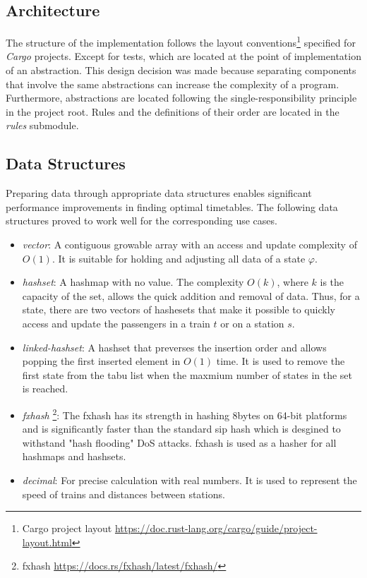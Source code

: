 \documentclass[a4paper,12pt,parskip]{article}
\begin{document}
\subsection{Architecture}

The structure of the implementation follows the layout 
conventions\footnote{Cargo project layout \url{https://doc.rust-lang.org/cargo/guide/project-layout.html}} 
specified for \emph{Cargo} projects. Except for tests, which are located at the 
point of implementation of an abstraction. This design decision was made because 
separating components that involve the same abstractions can increase the complexity 
of a program. Furthermore, abstractions are located following the single-responsibility 
principle in the project root. Rules and the definitions of their order are located 
in the \emph{rules} submodule.

\subsection{Data Structures}

Preparing data through appropriate data structures enables significant performance 
improvements in finding optimal timetables. The following data structures proved 
to work well for the corresponding use cases.

\begin{itemize}
    \item \emph{vector}: A contiguous growable array with an access and update 
    complexity of $O(1)$. It is suitable for holding and adjusting all data of a 
    state $\varphi$.
    \item \emph{hashset}: A hashmap with no value. The complexity $O(k)$, where 
    $k$ is the capacity of the set, allows the quick addition and removal of data.
    Thus, for a state, there are two vectors of hashesets that make it possible 
    to quickly access and update the passengers in a train $t$ or on a station $s$.
    \item \emph{linked-hashset}: A hashset that preverses the insertion order and 
    allows popping the first inserted element in $O(1)$ time. It is used to remove 
    the first state from the tabu list when the maxmium number of states in the set 
    is reached.
    \item \emph{fxhash} \footnote{fxhash \url{https://docs.rs/fxhash/latest/fxhash/}}: 
    The fxhash has its strength in hashing 8bytes on 64-bit platforms and is 
    significantly faster than the standard sip hash which is desgined to withstand 
    "hash flooding" DoS attacks. fxhash is used as a hasher for all hashmaps and 
    hashsets.
    \item \emph{decimal}: For precise calculation with real numbers. It is used 
    to represent the speed of trains and distances between stations.
\end{itemize}
\end{document}
